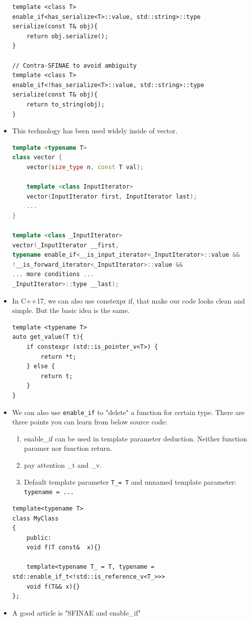 \documentclass[a4paper,11pt,twoside]{book}
\begin{document}
\begin{itemize}
\begin{lstlisting}[numbers=none]
template <class T>
enable_if<has_serialize<T>::value, std::string>::type
serialize(const T& obj){
	return obj.serialize();
}

// Contra-SFINAE to avoid ambiguity
template <class T>
enable_if<!has_serialize<T>::value, std::string>::type 
serialize(const T& obj){
	return to_string(obj);
}	
\end{lstlisting}	
	
	
	
	\item This technology has been used widely inside of vector.
\begin{lstlisting}[frame=single, language=c++]
template <typename T>
class vector {
	vector(size_type n, const T val);
	
	template <class InputIterator>
	vector(InputIterator first, InputIterator last);
	...
}

template <class _InputIterator>
vector(_InputIterator __first,
typename enable_if<__is_input_iterator<_InputIterator>::value &&
!__is_forward_iterator<_InputIterator>::value &&
... more conditions ...
_InputIterator>::type __last);
\end{lstlisting}	

\item In C++17, we can also use constexpr if, that make our code looks clean and simple. But the basic idea is the same. 

\begin{lstlisting}[numbers=none]
template <typename T>
auto get_value(T t){
	if constexpr (std::is_pointer_v<T>) {
		return *t;
	} else {
		return t;
	}
}
\end{lstlisting}

		\item We can also use \texttt{enable\_if} to "delete" a function for certain type. There are three points you can learn from below source code:
		\begin{enumerate}
			\item enable\_if can be used in template parameter deduction. Neither function paramer nor function return.
			\item pay attention \_t and \_v.
			\item Default template parameter \texttt{T\_= T} and unnamed template parameter: \texttt{typename = ...}
		\end{enumerate}
\begin{lstlisting}[numbers=none]
template<typename T>
class MyClass
{
	public:
	void f(T const&  x){}
	
	template<typename T_ = T, typename = std::enable_if_t<!std::is_reference_v<T_>>>
	void f(T&& x){}
};
\end{lstlisting}		
		
	
	\item A good article is "SFINAE and enable\_if"
\end{itemize}
\end{document}
